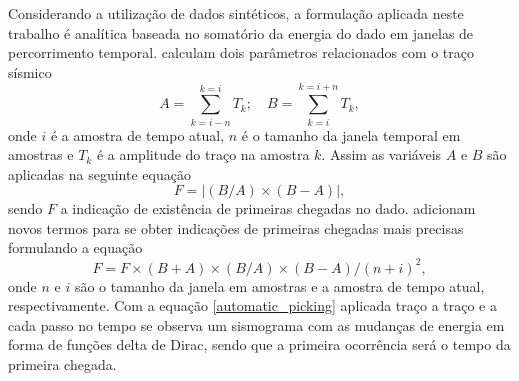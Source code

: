 Considerando a utilização de dados sintéticos, a formulação aplicada neste trabalho é analítica baseada no somatório da energia do dado em janelas de percorrimento temporal.  calculam dois parâmetros relacionados com o traço sísmico 
\begin{equation}
	A = \displaystyle\sum_{k=i-n}^{k=i} T_k;\,\,\,\,\,\, B = \displaystyle\sum_{k=i}^{k=i+n} T_k, 
\end{equation} 
\noindent onde $i$ é a amostra de tempo atual, $n$ é o tamanho da janela temporal em amostras e $T_k$ é a amplitude do traço na amostra $k$. Assim as variáveis $A$ e $B$ são aplicadas na seguinte equação
\begin{equation}
	F = |(B / A)\times(B - A)|,
\end{equation} 
\noindent sendo $F$ a indicação de existência de primeiras chegadas no dado.  adicionam novos termos para se obter indicações de primeiras chegadas mais precisas formulando a equação
\begin{equation}
	F = F\times(B + A)\times(B/A)\times(B-A)/(n+i)^2, 
	\label{automatic_picking}
\end{equation}
\noindent onde $n$ e $i$ são o tamanho da janela em amostras e a amostra de tempo atual, respectivamente. Com a equação \ref{automatic_picking} aplicada traço a traço e a cada passo no tempo se observa um sismograma com as mudanças de energia em forma de funções delta de Dirac, sendo que a primeira ocorrência será o tempo da primeira chegada.   